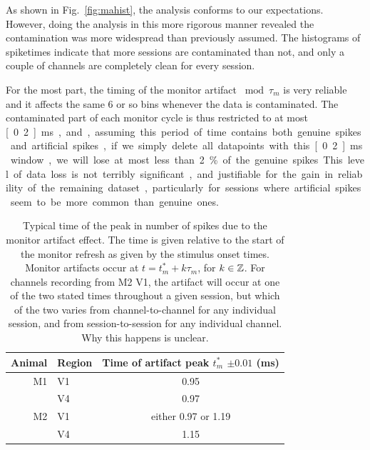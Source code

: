 
As shown in Fig.~\ref{fig:mahist}, the analysis conforms to our expectations.
However, doing the analysis in this more rigorous manner revealed the contamination was more widespread than previously assumed. The histograms of spiketimes indicate that more sessions are contaminated than not, and only a couple of channels are completely clean for every session.

For the most part, the timing of the monitor artifact $\bmod \tau_m$ is very reliable and it affects the same 6 or so bins whenever the data is contaminated. The contaminated part of each monitor cycle is thus restricted to at most \unit[0.2]{ms}, and, assuming this period of time contains both genuine spikes and artificial spikes, if we simply delete all datapoints with this \unit[0.2]{ms} window, we will lose at most less than 2\% of the genuine spikes. This level of data loss is not terribly significant, and justifiable for the gain in reliability of the remaining dataset, particularly for sessions where artificial spikes seem to be more common than genuine ones.

\begin{table}[hbtp]
\caption{Typical time of the peak in number of spikes due to the monitor artifact effect. The time is given relative to the start of the monitor refresh as given by the stimulus onset times. Monitor artifacts occur at $t = t^*_m + k \tau_m$, for $k \in \mathbb{Z}$. For channels recording from \ac{M2} \ac{V1}, the artifact will occur at one of the two stated times throughout a given session, but which of the two varies from channel-to-channel for any individual session, and from session-to-session for any individual channel. Why this happens is unclear.}
\label{tab:mapeak}
\begin{center}
\begin{tabular}{rlc}
\toprule
Animal  & Region & Time of artifact peak $t^*_m$ $\pm 0.01$ (\unit{ms})
\\
\midrule
M1  & V1    & 0.95
\\
        & V4    & 0.97
\\
M2    & V1    & either 0.97 or 1.19
\\
        & V4    & 1.15
\\
\bottomrule
\end{tabular}
\end{center}
\end{table}


